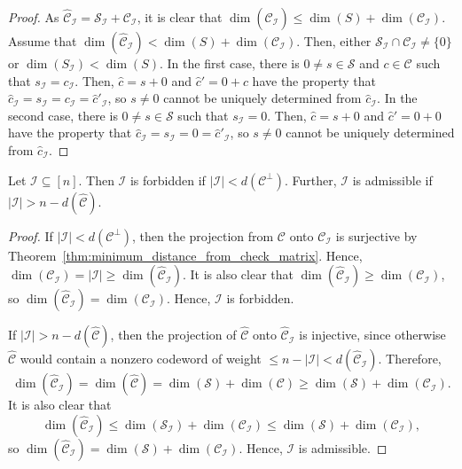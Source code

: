 \documentclass[../main.tex]{subfiles}
\begin{document}
\begin{proof}
\ProofRightarrow As $\hat{\mathcal{C}}_\mathcal{I} = \mathcal{S}_\mathcal{I} + \mathcal{C}_\mathcal{I}$, it is clear that $\dim(\hat{\mathcal{C}}_\mathcal{I}) \leq \dim(S) + \dim(\mathcal{C}_\mathcal{I})$. Assume that $\dim(\hat{\mathcal{C}}_\mathcal{I}) < \dim(S) + \dim(\mathcal{C}_\mathcal{I})$. Then, either $\mathcal{S}_\mathcal{I} \cap \mathcal{C}_\mathcal{I} \neq \{0\}$ or $\dim(S_\mathcal{I}) < \dim(S)$. In the first case, there is $0 \neq s \in \mathcal{S}$ and $c \in \mathcal{C}$ such that $s_\mathcal{I} = c_\mathcal{I}$. Then, $\hat{c} = s + 0$ and $\hat{c}' = 0 + c$ have the property that $\hat{c}_\mathcal{I} = s_\mathcal{I} = c_\mathcal{I} = \hat{c}'_\mathcal{I}$, so $s \neq 0$ cannot be uniquely determined from $\hat{c}_\mathcal{I}$. In the second case, there is $0 \neq s \in \mathcal{S}$ such that $s_\mathcal{I} = 0$. Then, $\hat{c} = s + 0$ and $\hat{c}' = 0 + 0$ have the property that $\hat{c}_\mathcal{I} = s_\mathcal{I} = 0 = \hat{c}'_\mathcal{I}$, so $s \neq 0$ cannot be uniquely determined from $\hat{c}_\mathcal{I}$.
\end{proof}

\begin{corollary}\label{cor:dual_distance_and_min_distance_condition}
Let $\mathcal{I} \subseteq [n]$. Then $\mathcal{I}$ is forbidden if $\lvert \mathcal{I} \rvert < d(\mathcal{C}^\perp)$. Further, $\mathcal{I}$ is admissible if $\lvert \mathcal{I} \rvert > n - d(\hat{\mathcal{C}})$.
\end{corollary}

\begin{proof}
If $\lvert \mathcal{I} \rvert < d(\mathcal{C}^\perp)$, then the projection from $\mathcal{C}$ onto $\mathcal{C}_\mathcal{I}$ is surjective by Theorem~\ref{thm:minimum_distance_from_check_matrix}. Hence, $\dim(\mathcal{C}_\mathcal{I}) = \lvert \mathcal{I} \rvert \geq \dim(\hat{\mathcal{C}}_\mathcal{I})$. It is also clear that $\dim(\hat{\mathcal{C}}_\mathcal{I}) \geq \dim(\mathcal{C}_\mathcal{I})$, so $\dim(\hat{\mathcal{C}}_\mathcal{I}) = \dim(\mathcal{C}_\mathcal{I})$. Hence, $\mathcal{I}$ is forbidden.

If $\lvert \mathcal{I} \rvert > n - d(\hat{\mathcal{C}})$, then the projection of $\hat{\mathcal{C}}$ onto $\hat{\mathcal{C}}_\mathcal{I}$ is injective, since otherwise $\hat{\mathcal{C}}$ would contain a nonzero codeword of weight $\leq n - \lvert \mathcal{I} \rvert < d(\hat{\mathcal{C}}_\mathcal{I})$. Therefore,
\begin{equation*}
    \dim(\hat{\mathcal{C}}_\mathcal{I}) = \dim(\hat{\mathcal{C}}) = \dim(\mathcal{S}) + \dim(\mathcal{C}) \geq \dim(\mathcal{S}) + \dim(\mathcal{C}_\mathcal{I}).
\end{equation*}
It is also clear that
\begin{equation*}
    \dim(\hat{\mathcal{C}}_\mathcal{I}) \leq \dim(\mathcal{S}_\mathcal{I}) + \dim(\mathcal{C}_\mathcal{I}) \leq \dim(\mathcal{S}) + \dim(\mathcal{C}_\mathcal{I}),
\end{equation*}
so $\dim(\hat{\mathcal{C}}_\mathcal{I}) = \dim(\mathcal{S}) + \dim(\mathcal{C}_\mathcal{I})$. Hence, $\mathcal{I}$ is admissible.
\end{proof}
\end{document}
